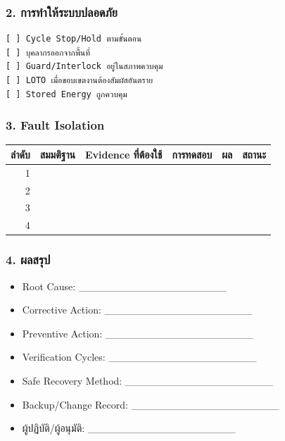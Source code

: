 \subsubsection{2. การทำให้ระบบปลอดภัย}

\begin{verbatim}
[ ] Cycle Stop/Hold ตามขั้นตอน
[ ] บุคลากรออกจากพื้นที่
[ ] Guard/Interlock อยู่ในสภาพควบคุม
[ ] LOTO เมื่อขอบเขตงานต้องสัมผัสอันตราย
[ ] Stored Energy ถูกควบคุม
\end{verbatim}

\subsubsection{3. Fault Isolation}

\begin{table}[htbp]
    \centering
    \begin{tabular}{r l l l l l}
        \hline
        \textbf{ลำดับ} & \textbf{สมมติฐาน} & \textbf{Evidence ที่ต้องใช้} & \textbf{การทดสอบ} & \textbf{ผล} & \textbf{สถานะ} \\
        \hline
        1 &  &  &  &  &  \\
        2 &  &  &  &  &  \\
        3 &  &  &  &  &  \\
        4 &  &  &  &  &  \\
        \hline
    \end{tabular}
\end{table}

\subsubsection{4. ผลสรุป}

\begin{itemize}
    \item Root Cause: \_\_\_\_\_\_\_\_\_\_\_\_\_\_\_\_\_\_\_\_
    \item Corrective Action: \_\_\_\_\_\_\_\_\_\_\_\_\_\_\_\_\_\_\_\_
    \item Preventive Action: \_\_\_\_\_\_\_\_\_\_\_\_\_\_\_\_\_\_\_\_
    \item Verification Cycles: \_\_\_\_\_\_\_\_\_\_\_\_\_\_\_\_\_\_\_\_
    \item Safe Recovery Method: \_\_\_\_\_\_\_\_\_\_\_\_\_\_\_\_\_\_\_\_
    \item Backup/Change Record: \_\_\_\_\_\_\_\_\_\_\_\_\_\_\_\_\_\_\_\_
    \item ผู้ปฏิบัติ/ผู้อนุมัติ: \_\_\_\_\_\_\_\_\_\_\_\_\_\_\_\_\_\_\_\_
\end{itemize}



